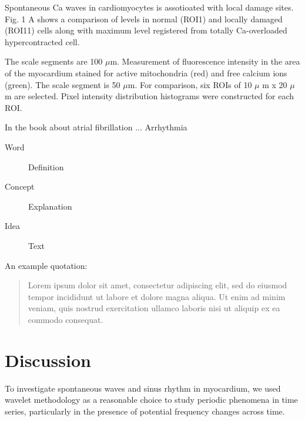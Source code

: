 \documentclass{biophys-new}
\begin{document}
Spontaneous Ca waves in cardiomyocytes is assotioated with local damage sites.
Fig. 1 A shows a comparison of  levels in normal (ROI1) and locally damaged (ROI11) cells along with maximum  level registered from totally Ca-overloaded hypercontracted cell.


The scale segments are 100 $\mu$m.
Measurement of fluorescence intensity in the area of the myocardium stained for active mitochondria (red) and free calcium ions (green).
The scale segment is 50 $\mu$m.
For comparison, six ROIs of 10 $\mu$ m x 20 $\mu$ m are selected.
Pixel intensity distribution histograms were constructed for each ROI.


In the book \cite{kockskamper2002subcellular} about atrial fibrillation ...
Arrhythmia





\begin{description}
\item[Word] Definition
\item[Concept] Explanation
\item[Idea] Text
\end{description}

An example quotation:

\begin{quote}
Lorem ipsum dolor sit amet, consectetur adipiscing elit, sed do eiusmod tempor incididunt ut labore et dolore magna aliqua. Ut enim ad minim veniam, quis nostrud exercitation ullamco laboris nisi ut aliquip ex ea commodo consequat.
\end{quote}


\section*{Discussion}

To investigate spontaneous  waves and sinus rhythm in myocardium, we
used wavelet methodology as a reasonable choice to study periodic phenomena in time series, particularly in the presence of potential frequency changes across time.
\end{document}
